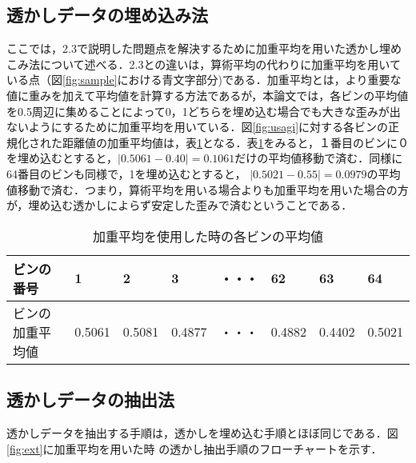 \documentclass[11pt]{jreport}
\begin{document}
{\subsection{透かしデータの埋め込み法}
ここでは，2.3で説明した問題点を解決するために加重平均を用いた透かし埋めこみ法について述べる．2.3との違いは，算術平均の代わりに加重平均を用いている点（図\ref{fig:sample}における青文字部分)である．加重平均とは，より重要な値に重みを加えて平均値を計算する方法であるが，本論文では，各ビンの平均値を0.5周辺に集めることによって0，1どちらを埋め込む場合でも大きな歪みが出ないようにするために加重平均を用いている．図\ref{fig:usagi}に対する各ビンの正規化された距離値の加重平均値は，表\ref{tab:kazyu}となる．表\ref{tab:kazyu}をみると，１番目のビンに０を埋め込むとすると，\begin{math}
|0.5061-0.40|=0.1061
\end{math}だけの平均値移動で済む．同様に64番目のビンも同様で，1を埋め込むとすると，
\begin{math}
|0.5021-0.55|=0.0979
\end{math}の平均値移動で済む．つまり，算術平均を用いる場合よりも加重平均を用いた場合の方が，埋め込む透かしによらず安定した歪みで済むということである．


\begin{table}[h]
\begin{center}
\caption{加重平均を使用した時の各ビンの平均値}
  \begin{tabular}{|l|l|l|l|l|l|l|l|} \hline
  ビンの番号 & 1 & 2 & 3 & ・・・ & 62 & 63 & 64 \\ \hline \hline
  ビンの加重平均値 &  0.5061 & 0.5081 & 0.4877 & ・・・ & 0.4882 & 0.4402 &0.5021 \\ \hline
  \end{tabular}
\label{tab:kazyu}
\end{center}
\end{table}















\newpage
\subsection{透かしデータの抽出法}
透かしデータを抽出する手順は，透かしを埋め込む手順とほぼ同じである．図\ref{fig:ext}に加重平均を用いた時
の透かし抽出手順のフローチャートを示す．


}
\end{document}
